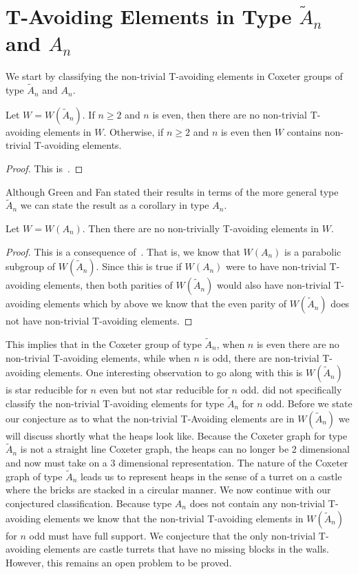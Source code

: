 \section{T-Avoiding Elements in Type $\widetilde{A}_n$ and $A_n$}
We start by classifying the non-trivial T-avoiding elements in Coxeter groups of type $\widetilde{A}_n$ and $A_n$. 
\begin{theorem}
Let $W=W(\widetilde{A}_n)$.  If $n \geq 2$ and $n$ is even, then there are no non-trivial T-avoiding elements in $W$. Otherwise, if $n \geq 2$ and $n$ is even then $W$ contains non-trivial T-avoiding elements.
\begin{proof}
	This is~\cite[Proposition~3.1.2.]{Fan1999}.
\end{proof}
\end{theorem}

Although Green and Fan stated their results in terms of the more general type $\widetilde{A}_n$ we can state the result as a corollary in type $A_n$.
\begin{corollary}
Let $W=W(A_n)$. Then there are no non-trivially T-avoiding elements in $W$. 
\begin{proof}
This is a consequence of~\cite[Proposition 3.1.2.]{Fan1999}.	 That is,  we know that $W(A_n)$ is a parabolic subgroup of $W(\widetilde{A}_n)$. Since this is true if $W(A_n)$ were to have non-trivial T-avoiding elements, then both parities of $W(\widetilde{A}_n)$ would also have non-trivial T-avoiding elements which by above we know that the even parity of $W(\widetilde{A}_n)$ does not have non-trivial T-avoiding elements.
\end{proof}
\end{corollary}

This implies that in the Coxeter group of type $\widetilde{A}_n$, when $n$ is even there are no non-trivial T-avoiding elements, while when $n$ is odd, there are non-trivial T-avoiding elements. One interesting observation to go along with this is $W(\widetilde{A}_n)$ is star reducible for $n$ even but not star reducible for $n$ odd. \cite{Fan1999} did not specifically classify the non-trivial T-avoiding elements for type $\widetilde{A}_n$ for $n$ odd. Before we state our conjecture as to what the non-trivial T-Avoiding elements are in $W(\widetilde{A}_n)$ we will discuss shortly what the heaps look like. Because the Coxeter graph for type $\widetilde{A}_n$ is not a straight line Coxeter graph, the heaps can no longer be 2 dimensional and now must take on a 3 dimensional representation. The nature of the Coxeter graph of type $\widetilde{A}_n$ leads us to represent heaps in the sense of a turret on a castle where the bricks are stacked in a circular manner. We now continue with our conjectured classification. Because type $A_n$ does not contain any non-trivial T-avoiding elements we know that the non-trivial T-avoiding elements in $W(\widetilde{A}_n)$ for $n$ odd must have full support. We conjecture that the only non-trivial T-avoiding elements are castle turrets that have no missing blocks in the walls. However, this remains an open problem to be proved.

